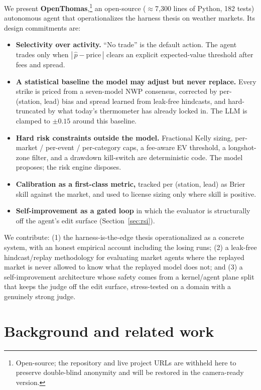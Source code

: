 \documentclass[sigconf,review,anonymous]{acmart}
\begin{document}
We present \textbf{OpenThomas},\footnote{Open-source; the repository and live
project URLs are withheld here to preserve double-blind anonymity and will be
restored in the camera-ready version.} an open-source ($\approx$7{,}300 lines of
Python, 182 tests) autonomous agent that operationalizes the harness thesis on
weather markets. Its design commitments are:

\begin{itemize}
\item \textbf{Selectivity over activity.} ``No trade'' is the default action. The
agent trades only when $|\,\hat{p}-\text{price}\,|$ clears an explicit
expected-value threshold after fees and spread.
\item \textbf{A statistical baseline the model may adjust but never replace.}
Every strike is priced from a seven-model NWP consensus, corrected by
per-(station, lead) bias and spread learned from leak-free hindcasts, and hard-
truncated by what today's thermometer has already locked in. The LLM is clamped
to $\pm 0.15$ around this baseline.
\item \textbf{Hard risk constraints outside the model.} Fractional Kelly sizing,
per-market / per-event / per-category caps, a fee-aware EV threshold, a
longshot-zone filter, and a drawdown kill-switch are deterministic code. The
model proposes; the risk engine disposes.
\item \textbf{Calibration as a first-class metric,} tracked per (station, lead)
as Brier skill against the market, and used to license sizing only where skill is
positive.
\item \textbf{Self-improvement as a gated loop} in which the evaluator is
structurally off the agent's edit surface (Section~\ref{sec:rsi}).
\end{itemize}

We contribute: (1) the harness-is-the-edge thesis operationalized as a concrete
system, with an honest empirical account including the losing runs; (2) a
leak-free hindcast/replay methodology for evaluating market agents where the
replayed market is never allowed to know what the replayed model does not; and
(3) a self-improvement architecture whose safety comes from a kernel/agent plane
split that keeps the judge off the edit surface, stress-tested on a domain with a
genuinely strong judge.

\section{Background and related work}
\end{document}
